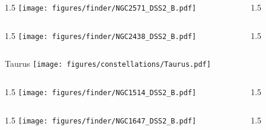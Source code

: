 \documentclass[final]{beamer}
\newlength{\colwidth}
\begin{document}

\begin{frame}[t]{}
  \begin{columns}[T]
    \begin{column}{1.5\colwidth}
      \centering
      \texttt{[image: figures/finder/NGC2571\_DSS2\_B.pdf]}
    \end{column}
    \begin{column}{1.5\colwidth}
      \Large
      
    \end{column}
  \end{columns}
  \vspace{\fill}
  \begin{columns}[T]
    \begin{column}{1.5\colwidth}
      \centering
      \texttt{[image: figures/finder/NGC2438\_DSS2\_B.pdf]}
    \end{column}
    \begin{column}{1.5\colwidth}
      \Large
      
    \end{column}
  \end{columns}
\end{frame}


\begin{frame}[t]{\LARGE Taurus}
  \centering
  \texttt{[image: figures/constellations/Taurus.pdf]}
\end{frame}


\begin{frame}[t]{}
  \begin{columns}[T]
    \begin{column}{1.5\colwidth}
      \centering
      \texttt{[image: figures/finder/NGC1514\_DSS2\_B.pdf]}
    \end{column}
    \begin{column}{1.5\colwidth}
      \Large
      
    \end{column}
  \end{columns}
  \vspace{\fill}
  \begin{columns}[T]
    \begin{column}{1.5\colwidth}
      \centering
      \texttt{[image: figures/finder/NGC1647\_DSS2\_B.pdf]}
    \end{column}
    \begin{column}{1.5\colwidth}
      \Large
      
    \end{column}
  \end{columns}
\end{frame}
\end{document}
